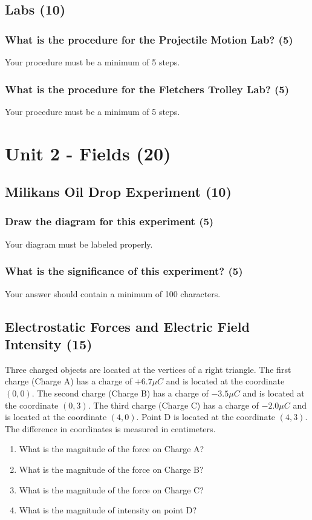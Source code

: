 \documentclass{article}
\begin{document}
\subsection{Labs (10)}
\subsubsection{What is the procedure for the Projectile Motion Lab? (5)}
Your procedure must be a minimum of 5 steps.

\subsubsection{What is the procedure for the Fletchers Trolley Lab? (5)}
Your procedure must be a minimum of 5 steps.

\section{Unit 2 - Fields (20)}
\subsection{Milikans Oil Drop Experiment (10)}
\subsubsection{Draw the diagram for this experiment (5)}
Your diagram must be labeled properly.

\subsubsection{What is the significance of this experiment? (5)}
Your answer should contain a minimum of 100 characters.

\subsection{Electrostatic Forces and Electric Field Intensity (15)}
Three charged objects are located at the vertices of a right triangle. The first charge (Charge A) has a charge of $+6.7\mu C$ and is located at the coordinate $(0, 0)$. The second charge (Charge B) has a charge of $-3.5\mu C$ and is located at the coordinate $(0, 3)$. The third charge (Charge C) has a charge of $-2.0\mu C$ and is located at the coordinate $(4, 0)$. Point D is located at the coordinate $(4, 3)$. The difference in coordinates is measured in centimeters.
\begin{enumerate}[label=\alph*)]
    \item What is the magnitude of the force on Charge A?
    \item What is the magnitude of the force on Charge B?
    \item What is the magnitude of the force on Charge C?
    \item What is the magnitude of intensity on point D?
\end{enumerate}
\end{document}
